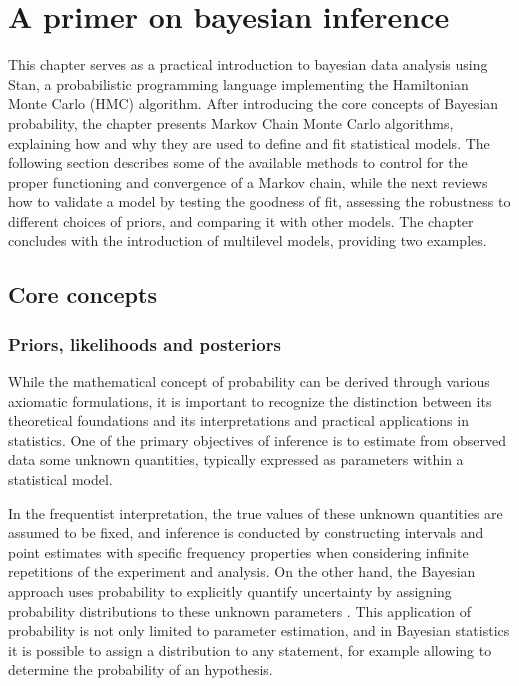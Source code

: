 \chapter{A primer on bayesian inference}
This chapter serves as a practical introduction to bayesian data analysis using Stan, a probabilistic programming language implementing the Hamiltonian Monte Carlo (HMC) algorithm. After
introducing the core concepts of Bayesian probability, the chapter presents Markov Chain Monte Carlo algorithms,
explaining how and why they are used to define and fit statistical models. The following section describes some of the
available methods to control for the proper functioning and convergence of a Markov chain, while the next reviews how to
validate a model by testing the goodness of fit, assessing the robustness to different choices of priors, and comparing it with other models. The chapter concludes with the introduction of
multilevel models, providing two examples.

\section{Core concepts}
\subsection{Priors, likelihoods and posteriors}\label{sub:pmp}
While the mathematical concept of probability can be derived through various axiomatic formulations, it is important to recognize the distinction between its theoretical foundations and its interpretations and practical applications in statistics.
One of the primary objectives of inference is to estimate from observed data some unknown quantities, typically expressed as parameters within a statistical model.

In the frequentist interpretation, the true values of these unknown quantities are assumed to be fixed, and inference is
conducted by constructing intervals and point estimates with specific frequency properties when considering infinite
repetitions of the experiment and analysis. On the other hand, the Bayesian approach uses probability to explicitly quantify uncertainty by assigning probability distributions to these unknown parameters  \cite{d2003bayesian}.
This application of probability is not only limited to parameter estimation, and in Bayesian statistics it is possible to assign a distribution to any statement, for example allowing to determine the probability of an hypothesis.





